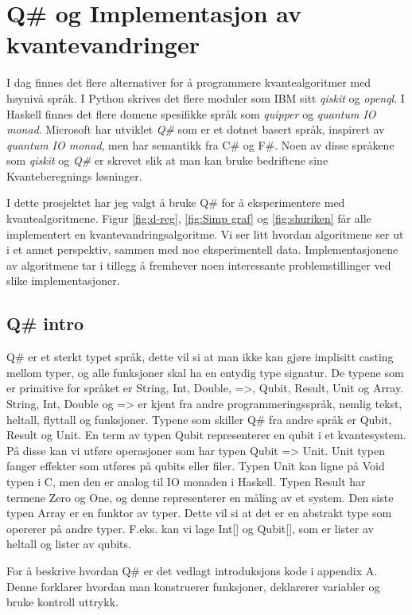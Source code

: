 \section{Q\# og Implementasjon av kvantevandringer}

    I dag finnes det flere alternativer for å programmere kvantealgoritmer med høynivå språk. I Python skrives det flere moduler som IBM sitt \emph{qiskit} og \emph{openql}. I Haskell finnes det flere domene spesifikke språk som \emph{quipper} og \emph{quantum IO monad}. Microsoft har utviklet \emph{Q\#} som er et dotnet basert språk, inspirert av \emph{quantum IO monad}, men har semantikk fra C\# og F\#. Noen av disse språkene som \emph{qiskit} og \emph{Q\#} er skrevet slik at man kan bruke bedriftene sine Kvanteberegnings løsninger.

    I dette prosjektet har jeg valgt å bruke Q\# for å eksperimentere med kvantealgoritmene. Figur \ref{fig:d-reg}, \ref{fig:Simp graf} og \ref{fig:shuriken} får alle implementert en kvantevandringsalgoritme. Vi ser litt hvordan algoritmene ser ut i et annet perspektiv, sammen med noe eksperimentell data. Implementasjonene av algoritmene tar i tillegg å fremhever noen interessante problemstillinger ved slike implementasjoner.

    \subsection{Q\# intro}

        Q\# er et sterkt typet språk, dette vil si at man ikke kan gjøre implisitt casting mellom typer, og alle funksjoner skal ha en entydig type signatur. De typene som er primitive for språket er String, Int, Double, =>, Qubit, Result, Unit og Array. String, Int, Double og => er kjent fra andre programmeringsspråk, nemlig tekst, heltall, flyttall og funksjoner. Typene som skiller Q\# fra andre språk er Qubit, Result og Unit. En term av typen Qubit representerer en qubit i et kvantesystem. På disse kan vi utføre operasjoner som har typen Qubit => Unit. Unit typen fanger effekter som utføres på qubits eller filer. Typen Unit kan ligne på Void typen i C, men den er analog til IO monaden i Haskell. Typen Result har termene Zero og One, og denne representerer en måling av et system. Den siste typen Array er en funktor av typer. Dette vil si at det er en abstrakt type som opererer på andre typer. F.eks. kan vi lage Int[] og Qubit[], som er lister av heltall og lister av qubits.

        For å beskrive hvordan Q\# er det vedlagt introduksjons kode i appendix A. Denne forklarer hvordan man konstruerer funksjoner, deklarerer variabler og bruke kontroll uttrykk.

